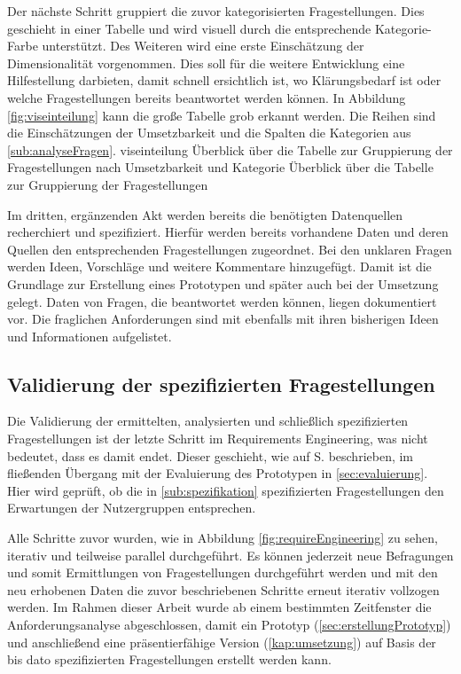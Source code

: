 Der nächste Schritt gruppiert die zuvor kategorisierten Fragestellungen.
Dies geschieht in einer Tabelle und wird visuell durch die entsprechende Kategorie-Farbe unterstützt.
Des Weiteren wird eine erste Einschätzung der Dimensionalität vorgenommen.
Dies soll für die weitere Entwicklung eine Hilfestellung darbieten, damit schnell ersichtlich ist, wo Klärungsbedarf ist oder welche Fragestellungen bereits beantwortet werden können.
In Abbildung \ref{fig:viseinteilung} kann die große Tabelle grob erkannt werden.
Die Reihen sind die Einschätzungen der Umsetzbarkeit und die Spalten die Kategorien aus \ref{sub:analyseFragen}.
\bildbreit
{viseinteilung}
{Überblick über die Tabelle zur Gruppierung der Fragestellungen nach Umsetzbarkeit und Kategorie}
{Überblick über die Tabelle zur Gruppierung der Fragestellungen}

Im dritten, ergänzenden Akt werden bereits die benötigten Datenquellen recherchiert und spezifiziert.
Hierfür werden bereits vorhandene Daten und deren Quellen den entsprechenden Fragestellungen zugeordnet.
Bei den unklaren Fragen werden Ideen, Vorschläge und weitere Kommentare hinzugefügt.
Damit ist die Grundlage zur Erstellung eines Prototypen und später auch bei der Umsetzung gelegt.
Daten von Fragen, die beantwortet werden können, liegen dokumentiert vor.
Die fraglichen Anforderungen sind mit ebenfalls mit ihren bisherigen Ideen und Informationen aufgelistet. 




\subsection{Validierung der spezifizierten Fragestellungen}
Die Validierung der ermittelten, analysierten und schließlich spezifizierten Fragestellungen ist der letzte Schritt im Requirements Engineering, was nicht bedeutet, dass es damit endet.
Dieser geschieht, wie auf S.\pageref{sec:erhebung} beschrieben, im fließenden Übergang mit der Evaluierung des Prototypen in \ref{sec:evaluierung}.
Hier wird geprüft, ob die in \ref{sub:spezifikation} spezifizierten Fragestellungen den Erwartungen der Nutzergruppen entsprechen.

Alle Schritte zuvor wurden, wie in Abbildung \ref{fig:requireEngineering} zu sehen, iterativ und teilweise parallel durchgeführt.
Es können jederzeit neue Befragungen und somit Ermittlungen von Fragestellungen durchgeführt werden und mit den neu erhobenen Daten die zuvor beschriebenen Schritte erneut iterativ vollzogen werden.
Im Rahmen dieser Arbeit wurde ab einem bestimmten Zeitfenster die Anforderungsanalyse abgeschlossen, damit ein Prototyp (\ref{sec:erstellungPrototyp}) und anschließend eine präsentierfähige Version (\ref{kap:umsetzung}) auf Basis der bis dato spezifizierten Fragestellungen erstellt werden kann.